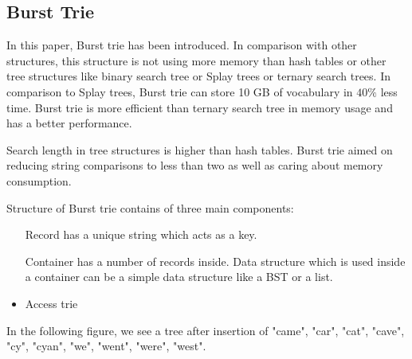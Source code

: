 \documentclass{report}
\begin{document}
\subsection{Burst Trie \cite{burst}}

In this paper, Burst trie has been introduced. In comparison with other structures, this structure is not using more memory than hash tables or other tree structures like binary search tree or Splay trees \cite{splay} or ternary search trees. In comparison to Splay trees, Burst trie can store 10 GB of vocabulary in $40\%$ less   time. Burst trie is more efficient than ternary search tree in memory usage and has a better performance.

Search length in tree structures is higher than hash tables. Burst trie aimed on reducing string comparisons to less than two as well as caring about memory consumption.

Structure of Burst trie contains of three main components:
\begin{itemize}

\item[Record] has a unique string which acts as a key. 

\item [Container] has a number of records inside. Data structure which is used inside a container can be a simple data structure like a BST or a list.

\item Access trie
\end{itemize}  


In the following figure, we see a tree after insertion of "came", "car", "cat", "cave", "cy", "cyan", "we", "went", "were", "west".
\end{document}
